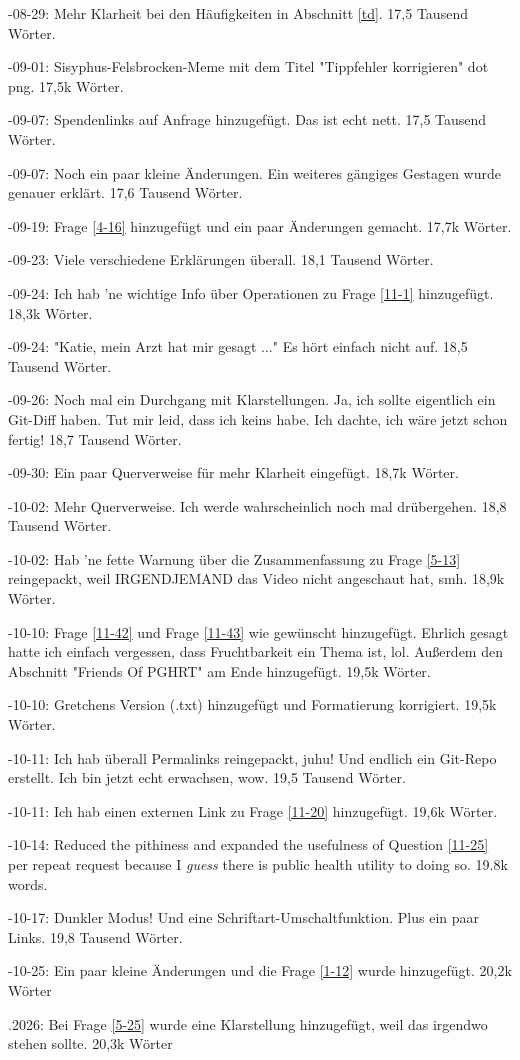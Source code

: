 \documentclass{article}
\begin{document}
-08-29: Mehr Klarheit bei den Häufigkeiten in Abschnitt \ref{td}. 17,5 Tausend Wörter.

-09-01: Sisyphus-Felsbrocken-Meme mit dem Titel "Tippfehler korrigieren" dot png. 17,5k Wörter.

-09-07: Spendenlinks auf Anfrage hinzugefügt. Das ist echt nett. 17,5 Tausend Wörter.

-09-07: Noch ein paar kleine Änderungen. Ein weiteres gängiges Gestagen wurde genauer erklärt. 17,6 Tausend Wörter.

-09-19: Frage \ref{4-16} hinzugefügt und ein paar Änderungen gemacht. 17,7k Wörter.

-09-23: Viele verschiedene Erklärungen überall. 18,1 Tausend Wörter.

-09-24: Ich hab 'ne wichtige Info über Operationen zu Frage \ref{11-1} hinzugefügt. 18,3k Wörter.

-09-24: "Katie, mein Arzt hat mir gesagt ..." Es hört einfach nicht auf. 18,5 Tausend Wörter.

-09-26: Noch mal ein Durchgang mit Klarstellungen. Ja, ich sollte eigentlich ein Git-Diff haben. Tut mir leid, dass ich keins habe. Ich dachte, ich wäre jetzt schon fertig! 18,7 Tausend Wörter.

-09-30: Ein paar Querverweise für mehr Klarheit eingefügt. 18,7k Wörter.

-10-02: Mehr Querverweise. Ich werde wahrscheinlich noch mal drübergehen. 18,8 Tausend Wörter.

-10-02: Hab 'ne fette Warnung über die Zusammenfassung zu Frage \ref{5-13} reingepackt, weil IRGENDJEMAND das Video nicht angeschaut hat, smh. 18,9k Wörter.

-10-10: Frage \ref{11-42} und Frage \ref{11-43} wie gewünscht hinzugefügt. Ehrlich gesagt hatte ich einfach vergessen, dass Fruchtbarkeit ein Thema ist, lol. Außerdem den Abschnitt "Friends Of PGHRT" am Ende hinzugefügt. 19,5k Wörter.

-10-10: Gretchens Version (.txt) hinzugefügt und Formatierung korrigiert. 19,5k Wörter.

-10-11: Ich hab überall Permalinks reingepackt, juhu! Und endlich ein Git-Repo erstellt. Ich bin jetzt echt erwachsen, wow. 19,5 Tausend Wörter.

-10-11: Ich hab einen externen Link zu Frage \ref{11-20} hinzugefügt. 19,6k Wörter.

-10-14: Reduced the pithiness and expanded the usefulness of Question \ref{11-25} per repeat request because I \textit{guess} there is public health utility to doing so. 19.8k words.

-10-17: Dunkler Modus! Und eine Schriftart-Umschaltfunktion. Plus ein paar Links. 19,8 Tausend Wörter.

-10-25: Ein paar kleine Änderungen und die Frage \ref{1-12} wurde hinzugefügt. 20,2k Wörter

.2026: Bei Frage \ref{5-25} wurde eine Klarstellung hinzugefügt, weil das irgendwo stehen sollte. 20,3k Wörter
\end{document}
